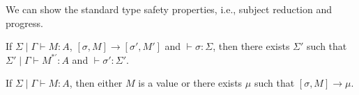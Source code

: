 We can show the standard type safety properties, i.e., subject reduction and progress.
\begin{thm}
  If $\Sigma\mid\Gamma \vdash M : A$, $[\sigma,M] \to [\sigma',M']$ and $\vdash \sigma : \Sigma$,
  then there exists $\Sigma'$ such that $\Sigma' \mid \Gamma \vdash M^{*'} : A$ and $\vdash \sigma' : \Sigma'$.
\end{thm}

\begin{thm}[Progress]
  If $\Sigma \mid \Gamma \vdash M : A$,
  then either $M$ is a value or there exists $\mu$ such that $[\sigma,M] \to \mu$.
\end{thm}

